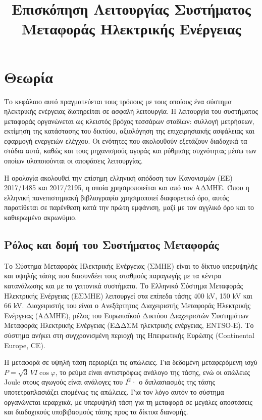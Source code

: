 \title{Επισκόπηση Λειτουργίας Συστήματος Μεταφοράς Ηλεκτρικής Ενέργειας}

\section{Θεωρία}
\label{kef-01-theoria}

Το κεφάλαιο αυτό πραγματεύεται τους τρόπους με τους οποίους ένα σύστημα ηλεκτρικής ενέργειας
διατηρείται σε ασφαλή λειτουργία. Η λειτουργία του συστήματος μεταφοράς οργανώνεται ως
κλειστός βρόχος τεσσάρων σταδίων: συλλογή μετρήσεων, εκτίμηση της κατάστασης του δικτύου,
αξιολόγηση της επιχειρησιακής ασφάλειας και εφαρμογή ενεργειών ελέγχου. Οι ενότητες που
ακολουθούν εξετάζουν διαδοχικά τα στάδια αυτά, καθώς και τους μηχανισμούς αγοράς και
ρύθμισης συχνότητας μέσω των οποίων υλοποιούνται οι αποφάσεις λειτουργίας.

Η ορολογία ακολουθεί την επίσημη ελληνική απόδοση των Κανονισμών (ΕΕ) 2017/1485 και
2017/2195, η οποία χρησιμοποιείται και από τον ΑΔΜΗΕ. Όπου η ελληνική πανεπιστημιακή
βιβλιογραφία χρησιμοποιεί διαφορετικό όρο, αυτός παρατίθεται σε παρένθεση κατά την πρώτη
εμφάνιση, μαζί με τον αγγλικό όρο και το καθιερωμένο ακρωνύμιο.

\subsection{Ρόλος και δομή του Συστήματος Μεταφοράς}

Το Σύστημα Μεταφοράς Ηλεκτρικής Ενέργειας (ΣΜΗΕ) είναι το δίκτυο υπερυψηλής και υψηλής
τάσης που διασυνδέει τους σταθμούς παραγωγής με τα κέντρα κατανάλωσης και με τα γειτονικά
συστήματα. Το Ελληνικό Σύστημα Μεταφοράς Ηλεκτρικής Ενέργειας (ΕΣΜΗΕ) λειτουργεί στα επίπεδα
τάσης 400 kV, 150 kV και 66 kV. Διαχειριστής του είναι ο Ανεξάρτητος Διαχειριστής Μεταφοράς
Ηλεκτρικής Ενέργειας (ΑΔΜΗΕ), μέλος του Ευρωπαϊκού Δικτύου Διαχειριστών Συστημάτων Μεταφοράς
Ηλεκτρικής Ενέργειας (ΕΔΔΣΜ ηλεκτρικής ενέργειας, ENTSO-E). Το σύστημα ανήκει στη
συγχρονισμένη περιοχή της Ηπειρωτικής Ευρώπης (Continental Europe, CE).

Η μεταφορά σε υψηλή τάση περιορίζει τις απώλειες. Για δεδομένη μεταφερόμενη ισχύ
$P = \sqrt{3}\,V I \cos\varphi$, το ρεύμα είναι αντιστρόφως ανάλογο της τάσης, ενώ οι
απώλειες Joule στους αγωγούς είναι ανάλογες του $I^2$· ο διπλασιασμός της τάσης
υποτετραπλασιάζει επομένως τις απώλειες. Για τον λόγο αυτόν το σύστημα οργανώνεται
ιεραρχικά, με υπερυψηλή τάση για τη μεταφορά σε μεγάλες αποστάσεις και διαδοχικούς
υποβιβασμούς τάσης προς τα δίκτυα διανομής.

